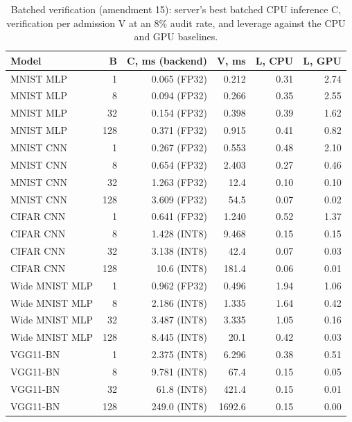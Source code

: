 \documentclass[11pt]{article}
\newcommand{\botrule}{\bottomrule}
\begin{document}
\begin{table}[htbp]
\caption{Batched verification (amendment 15): server's best batched CPU inference C, verification per admission V at an 8\% audit rate, and leverage against the CPU and GPU baselines.}
\centering
\small
\begin{tabularx}{\textwidth}{Xrrrrr}
\toprule
Model & B & C, ms (backend) & V, ms & L, CPU & L, GPU \\
\midrule
MNIST MLP & 1 & 0.065 (FP32) & 0.212 & 0.31 & 2.74 \\
MNIST MLP & 8 & 0.094 (FP32) & 0.266 & 0.35 & 2.55 \\
MNIST MLP & 32 & 0.154 (FP32) & 0.398 & 0.39 & 1.62 \\
MNIST MLP & 128 & 0.371 (FP32) & 0.915 & 0.41 & 0.82 \\
MNIST CNN & 1 & 0.267 (FP32) & 0.553 & 0.48 & 2.10 \\
MNIST CNN & 8 & 0.654 (FP32) & 2.403 & 0.27 & 0.46 \\
MNIST CNN & 32 & 1.263 (FP32) & 12.4 & 0.10 & 0.10 \\
MNIST CNN & 128 & 3.609 (FP32) & 54.5 & 0.07 & 0.02 \\
CIFAR CNN & 1 & 0.641 (FP32) & 1.240 & 0.52 & 1.37 \\
CIFAR CNN & 8 & 1.428 (INT8) & 9.468 & 0.15 & 0.15 \\
CIFAR CNN & 32 & 3.138 (INT8) & 42.4 & 0.07 & 0.03 \\
CIFAR CNN & 128 & 10.6 (INT8) & 181.4 & 0.06 & 0.01 \\
Wide MNIST MLP & 1 & 0.962 (FP32) & 0.496 & 1.94 & 1.06 \\
Wide MNIST MLP & 8 & 2.186 (INT8) & 1.335 & 1.64 & 0.42 \\
Wide MNIST MLP & 32 & 3.487 (INT8) & 3.335 & 1.05 & 0.16 \\
Wide MNIST MLP & 128 & 8.445 (INT8) & 20.1 & 0.42 & 0.03 \\
VGG11-BN & 1 & 2.375 (INT8) & 6.296 & 0.38 & 0.51 \\
VGG11-BN & 8 & 9.781 (INT8) & 67.4 & 0.15 & 0.05 \\
VGG11-BN & 32 & 61.8 (INT8) & 421.4 & 0.15 & 0.01 \\
VGG11-BN & 128 & 249.0 (INT8) & 1692.6 & 0.15 & 0.00 \\
\botrule
\end{tabularx}
\end{table}
\end{document}
